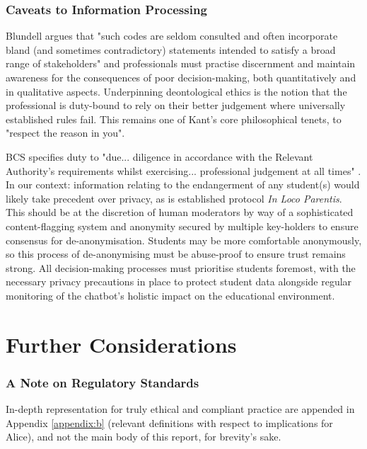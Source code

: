 \documentclass[14pt,a4paper]{article}
\begin{document}
\begin{multicols}{2}
\subsubsection*{Caveats to Information Processing}

Blundell argues that "such codes are seldom consulted and often incorporate bland (and sometimes contradictory) statements intended to satisfy a broad range of stakeholders" \textit{\parencite[p. 40]{Blundell2020}} and professionals must practise discernment and maintain awareness for the consequences of poor decision-making, both quantitatively and in qualitative aspects.
Underpinning deontological ethics is the notion that the professional is duty-bound to rely on their better judgement where universally established rules fail.
This remains one of Kant's core philosophical tenets, to "respect the reason in you".

BCS specifies duty to "due... diligence in accordance with the Relevant Authority's requirements whilst exercising... professional judgement at all times" \textit{\parencite[p. 2]{BCS2024}}. In our context: information relating to the endangerment of any student(s) would likely take precedent over privacy, as is established protocol \textit{In Loco Parentis}.
This should be at the discretion of human moderators by way of a sophisticated content-flagging system and anonymity secured by multiple key-holders to ensure consensus for de-anonymisation.
Students may be more comfortable anonymously, so this process of de-anonymising must be abuse-proof to ensure trust remains strong.
All decision-making processes must prioritise students foremost, with the necessary privacy precautions in place to protect student data alongside regular monitoring of the chatbot's holistic impact on the educational environment.



\section{Further Considerations}

\subsubsection*{A Note on Regulatory Standards}
In-depth representation for truly ethical and compliant practice are appended in Appendix \ref{appendix:b} (relevant definitions with respect to implications for Alice), and not the main body of this report, for brevity's sake.



\end{multicols}
\end{document}
